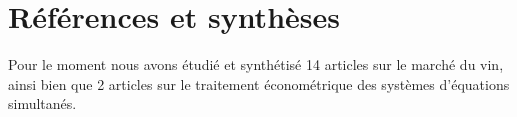 \documentclass[11pt, a4paper]{article}
\begin{document}
\section*{Références et synthèses}
Pour le moment nous avons étudié et synthétisé 14 articles sur le marché du vin, ainsi bien que 2 articles sur le traitement économétrique des systèmes d'équations simultanés. 
\end{document}
